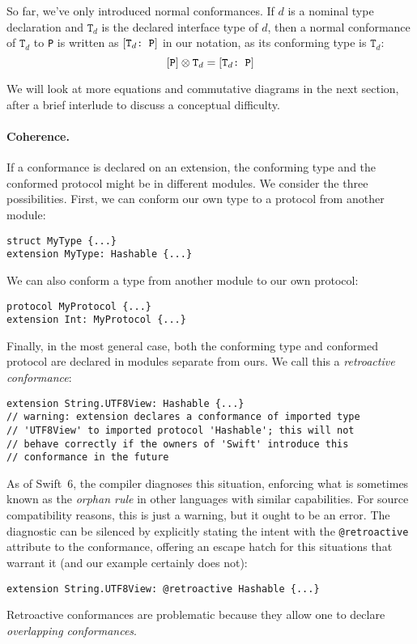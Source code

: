 \documentclass[../generics]{subfiles}
\begin{document}
\newcommand{\NormalConf}{\ConfReq{$\texttt{T}_d$}{P}}

So far, we've only introduced normal conformances. If $d$ is a nominal type declaration and $\texttt{T}_d$ is the declared interface type of $d$, then a normal conformance of $\texttt{T}_d$ to \texttt{P} is written as $\NormalConf$ in our notation, as its conforming type is $\texttt{T}_d$:
\[\pP\otimes\texttt{T}_d=\NormalConf\]

We will look at more equations and commutative diagrams in the next section, after a brief interlude to discuss a conceptual difficulty.

\paragraph{Coherence.} If a conformance is declared on an extension, the conforming type and the conformed protocol might be in different modules. We consider the three possibilities. First, we can conform our own type to a protocol from another module:
\begin{Verbatim}
struct MyType {...}
extension MyType: Hashable {...}
\end{Verbatim}
We can also conform a type from another module to our own protocol:
\begin{Verbatim}
protocol MyProtocol {...}
extension Int: MyProtocol {...}
\end{Verbatim}
Finally, in the most general case, both the conforming type and conformed protocol are declared in modules separate from ours. We call this a \emph{retroactive conformance}:
\begin{Verbatim}
extension String.UTF8View: Hashable {...}
// warning: extension declares a conformance of imported type
// 'UTF8View' to imported protocol 'Hashable'; this will not
// behave correctly if the owners of 'Swift' introduce this
// conformance in the future
\end{Verbatim}
As of Swift~6, the compiler diagnoses this situation, enforcing what is sometimes known as the \emph{orphan rule} in other languages with similar capabilities. For source compatibility reasons, this is just a warning, but it ought to be an error. The diagnostic can be silenced by explicitly stating the intent with the \texttt{@retroactive} attribute to the conformance, offering an escape hatch for this situations that warrant it (and our example certainly does not):
\begin{Verbatim}
extension String.UTF8View: @retroactive Hashable {...}
\end{Verbatim}
Retroactive conformances are problematic because they allow one to declare \emph{overlapping conformances}.
\end{document}
